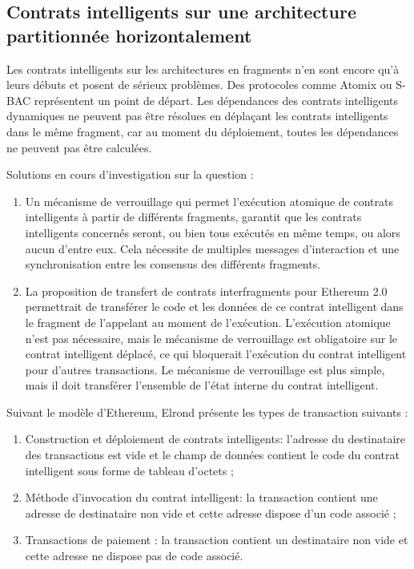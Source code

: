 \documentclass[journal]{IEEEtran}
\begin{document}
\subsection{Contrats intelligents sur une architecture partitionnée horizontalement}
Les contrats intelligents sur les architectures en fragments n'en sont encore qu'à leurs débuts et posent de sérieux problèmes. Des protocoles comme Atomix \cite{7} ou S-BAC \cite{9} représentent un point de départ. Les dépendances des contrats intelligents dynamiques ne peuvent pas être résolues en déplaçant les contrats intelligents dans le même fragment, car au moment du déploiement, toutes les dépendances ne peuvent pas être calculées.

Solutions en cours d'investigation sur la question :
\begin{enumerate}
  \item Un mécanisme de verrouillage qui permet l'exécution atomique de contrats intelligents à partir de différents fragments, garantit que les contrats intelligents concernés seront, ou bien tous exécutés en même temps, ou alors aucun d'entre eux. Cela nécessite de multiples messages d'interaction et une synchronisation entre les consensus des différents fragments.  \cite{9} 
  \item La proposition de transfert de contrats interfragments pour Ethereum 2.0 permettrait de transférer le code et les données de ce contrat intelligent dans le fragment de l'appelant au moment de l'exécution. L'exécution atomique n'est pas nécessaire, mais le mécanisme de verrouillage est obligatoire sur le contrat intelligent déplacé, ce qui bloquerait l'exécution du contrat intelligent pour d'autres transactions. Le mécanisme de verrouillage est plus simple, mais il doit transférer l'ensemble de l'état interne du contrat intelligent. \cite{43} 
\end{enumerate}

Suivant le modèle d'Ethereum, Elrond présente les types de transaction suivants :
\begin{enumerate}
  \item Construction et déploiement de contrats intelligents: l'adresse du destinataire des transactions est vide et le champ de données contient le code du contrat intelligent sous forme de tableau d'octets ;
  \item Méthode d'invocation du contrat intelligent: la transaction contient une adresse de destinataire non vide et cette adresse dispose d'un code associé ;
  \item Transactions de paiement : la transaction contient un destinataire non vide et cette adresse ne dispose pas de code associé.
\end{enumerate}
 
\end{document}
